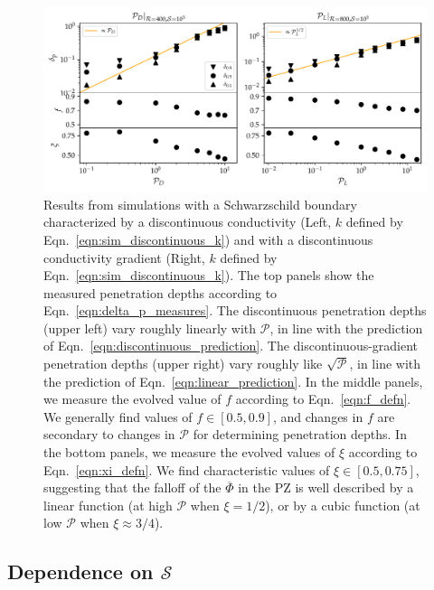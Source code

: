 \documentclass{aastex631}
\newcommand{\mP}{\ensuremath{\mathcal{P}}}
\newcommand{\mS}{\ensuremath{\mathcal{S}}}
\renewcommand{\bar}[1]{\overline{#1}}
\begin{document}
\begin{figure}[t!]
\centering
\includegraphics[width=\textwidth]{parameters_vs_p.pdf}
\caption{
Results from simulations with a Schwarzschild boundary characterized by a discontinuous conductivity (Left, $k$ defined by Eqn.~\ref{eqn:sim_discontinuous_k}) and with a discontinuous conductivity gradient (Right, $k$ defined by Eqn.~\ref{eqn:sim_discontinuous_k}).
The top panels show the measured penetration depths according to Eqn.~\ref{eqn:delta_p_measures}.
The discontinuous penetration depths (upper left) vary roughly linearly with $\mP$, in line with the prediction of Eqn.~\ref{eqn:discontinuous_prediction}.
The discontinuous-gradient penetration depths (upper right) vary roughly like $\sqrt{\mP}$, in line with the prediction of Eqn.~\ref{eqn:linear_prediction}.
In the middle panels, we measure the evolved value of $f$ according to Eqn.~\ref{eqn:f_defn}.
We generally find values of $f \in [0.5, 0.9]$, and changes in $f$ are secondary to changes in $\mP$ for determining penetration depths.
In the bottom panels, we measure the evolved values of $\xi$ according to Eqn.~\ref{eqn:xi_defn}.
We find characteristic values of $\xi \in [0.5, 0.75]$, suggesting that the falloff of the $\bar{\Phi}$ in the PZ is well described by a linear function (at high $\mP$ when $\xi = 1/2$), or by a cubic function (at low $\mP$ when $\xi \approx 3/4$).
\label{fig:parameters_vs_p}
}
\end{figure}

\subsection{Dependence on $\mS$}
\end{document}
